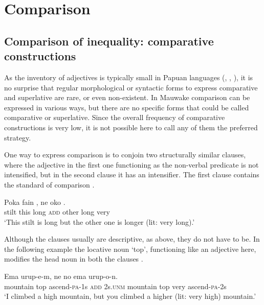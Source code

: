 \section{Comparison} \label{sec:6.5}

\subsection{Comparison of inequality: comparative constructions}

As the inventory of adjectives is typically small in Papuan languages (\citealt[268]{Haiman1980}, \citealt[63]{Reesink1987}, \citealt[105--107]{MacDonald1990}), it is no surprise that regular morphological or syntactic forms to express comparative and superlative are rare, or even non-existent. In Mauwake comparison can be expressed in various ways, but there are no specific forms that could be called comparative or superlative. Since the overall frequency of comparative constructions is very low, it is not possible here to call any of them the preferred strategy.

One way to express comparison is to conjoin two structurally similar clauses, where the adjective in the first one functioning as the non-verbal predicate is not intensified, but in the second clause it has an intensifier. The first clause contains the standard of comparison . 

\ea%
\label{ex:6:x1336}
\gll Poka  fain  ,  ne  oko    . \\
stilt  this  long  \textsc{add}  other  long  very\\
\glt `This stilt is long but the other one is longer (lit: very long).'
\z

Although the clauses usually are descriptive, as above, they do not have to be. In the following example the locative noun  `top', functioning like an adjective here, modifies the head noun in both the clauses .  

\ea%
\label{ex:6:x1324}
\gll Ema   urup-e-m,  ne  no  ema     urup-o-n.\\
mountain  top  ascend-\textsc{pa}-1s  \textsc{add}  2s.\textsc{unm}  mountain top  very  ascend-\textsc{pa}-2s\\
\glt `I climbed a high mountain, but you climbed a higher (lit: very high) mountain.'
\z

